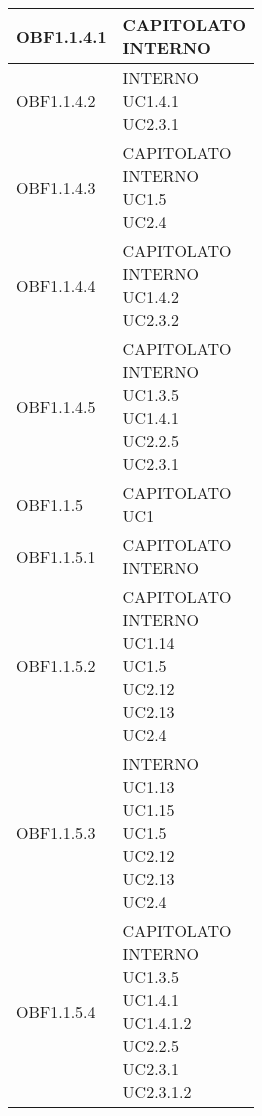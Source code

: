 \documentclass{scalatekids-article}
\begin{document}
\begin{longtable}[H]{|p{5.5cm}|p{5.5cm}|}
\hline
OBF1.1.4.1 & \multiLineCell[t]{CAPITOLATO\\INTERNO\\}\\
\hline
OBF1.1.4.2 & \multiLineCell[t]{INTERNO\\UC1.4.1\\UC2.3.1\\}\\
\hline
OBF1.1.4.3 & \multiLineCell[t]{CAPITOLATO\\INTERNO\\UC1.5\\UC2.4\\}\\
\hline
OBF1.1.4.4 & \multiLineCell[t]{CAPITOLATO\\INTERNO\\UC1.4.2\\UC2.3.2\\}\\
\hline
OBF1.1.4.5 & \multiLineCell[t]{CAPITOLATO\\INTERNO\\UC1.3.5\\UC1.4.1\\UC2.2.5\\UC2.3.1\\}\\
\hline
OBF1.1.5 & \multiLineCell[t]{CAPITOLATO\\UC1\\}\\
\hline
OBF1.1.5.1 & \multiLineCell[t]{CAPITOLATO\\INTERNO\\}\\
\hline
OBF1.1.5.2 & \multiLineCell[t]{CAPITOLATO\\INTERNO\\UC1.14\\UC1.5\\UC2.12\\UC2.13\\UC2.4\\}\\
\hline
OBF1.1.5.3 & \multiLineCell[t]{INTERNO\\UC1.13\\UC1.15\\UC1.5\\UC2.12\\UC2.13\\UC2.4\\}\\
\hline
OBF1.1.5.4 & \multiLineCell[t]{CAPITOLATO\\INTERNO\\UC1.3.5\\UC1.4.1\\UC1.4.1.2\\UC2.2.5\\UC2.3.1\\UC2.3.1.2\\}\\

\end{longtable}
\end{document}
